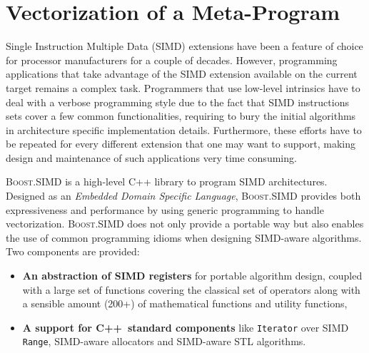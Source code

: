\documentclass[preprint]{sigplanconf}
\providecommand{\boostsimd}{\textsc{Boost.SIMD}}
\providecommand{\cpp}[1][~]{\textsc{C++}#1}
\begin{document}
\section{Vectorization of a Meta-Program}
\label{sec:meta-vectorization}

Single Instruction Multiple Data (SIMD) extensions have been a feature of
choice for processor manufacturers for a couple of decades. However,
programming applications that take advantage of the SIMD extension available on
the current target remains a complex task. Programmers that use low-level
intrinsics have to deal with a verbose programming style due to the fact that
SIMD instructions sets cover a few common functionalities, requiring to bury
the initial algorithms in architecture specific implementation details.
Furthermore, these efforts have to be repeated for every different extension
that one may want to support, making design and maintenance of such
applications very time consuming. 

\boostsimd{} is a high-level C++ library to program SIMD architectures. 
Designed as an \textit{Embedded Domain Specific Language}, \boostsimd{} 
provides both expressiveness and performance by using generic programming 
to handle vectorization. \boostsimd{} does not only provide a portable 
way but also enables the use of common programming idioms when designing 
SIMD-aware algorithms. Two components are provided:

\begin{itemize}
\item \textbf{An abstraction of SIMD registers} for portable algorithm design,
coupled with a large set of functions covering the classical set of operators
along with a sensible amount (200+) of mathematical functions and utility functions,
\item \textbf{A support for \cpp standard components} like \texttt{Iterator}
over SIMD \texttt{Range}, SIMD-aware allocators and SIMD-aware STL algorithms.
\end{itemize}
\end{document}
